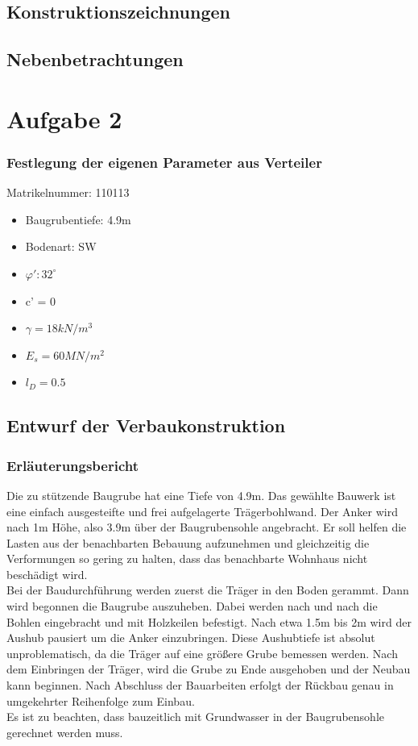 \documentclass[11pt,fleqn,a4paper,halfparskip]{article}
\begin{document}
\subsection{Konstruktionszeichnungen}
\subsection{Nebenbetrachtungen}


\newpage
\section{Aufgabe 2}
\subsubsection*{Festlegung der eigenen Parameter aus Verteiler}
Matrikelnummer: 110113\\
\begin{itemize}
\item Baugrubentiefe: 4.9m
\item Bodenart: SW
\item $\varphi': 32^\circ$
\item c' = 0
\item $\gamma = 18kN/m^3$
\item $E_s = 60MN/m^2$
\item $l_D = 0.5$
\end{itemize}
\subsection{Entwurf der Verbaukonstruktion}
\subsubsection{Erläuterungsbericht}
Die zu stützende Baugrube hat eine Tiefe von 4.9m. Das gewählte Bauwerk ist eine einfach ausgesteifte und frei aufgelagerte Trägerbohlwand. Der Anker wird nach 1m Höhe, also 3.9m über der Baugrubensohle angebracht. Er soll helfen die Lasten aus der benachbarten Bebauung aufzunehmen und gleichzeitig die Verformungen so gering zu halten, dass das benachbarte Wohnhaus nicht beschädigt wird. \\
Bei der Baudurchführung werden zuerst die Träger in den Boden gerammt. Dann wird begonnen die Baugrube auszuheben. Dabei werden nach und nach die Bohlen eingebracht und mit Holzkeilen befestigt. Nach etwa 1.5m bis 2m wird der Aushub pausiert um die Anker einzubringen. Diese Aushubtiefe ist absolut unproblematisch, da die Träger auf eine größere Grube bemessen werden. Nach dem Einbringen der Träger, wird die Grube zu Ende ausgehoben und der Neubau kann beginnen. Nach Abschluss der Bauarbeiten erfolgt der Rückbau genau in umgekehrter Reihenfolge zum Einbau.\\
Es ist zu beachten, dass bauzeitlich mit Grundwasser in der Baugrubensohle gerechnet werden muss.
\end{document}
